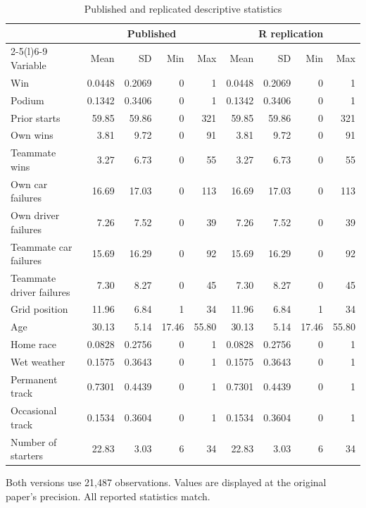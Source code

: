 \begin{table}[!htbp]
\centering
\caption{Published and replicated descriptive statistics}
\label{tab:descriptive}
\fontsize{8.5}{10}\selectfont
\setlength{\tabcolsep}{2pt}
\renewcommand{\arraystretch}{1.08}
\begin{tabular*}{\linewidth}{@{\extracolsep{\fill}}lrrrrrrrr@{}}
\toprule
 & \multicolumn{4}{c}{Published} & \multicolumn{4}{c}{R replication} \\
\cmidrule(lr){2-5}\cmidrule(l){6-9}
Variable & Mean & SD & Min & Max & Mean & SD & Min & Max \\
\midrule
Win & 0.0448 & 0.2069 & 0 & 1 & 0.0448 & 0.2069 & 0 & 1 \\
Podium & 0.1342 & 0.3406 & 0 & 1 & 0.1342 & 0.3406 & 0 & 1 \\
Prior starts & 59.85 & 59.86 & 0 & 321 & 59.85 & 59.86 & 0 & 321 \\
Own wins & 3.81 & 9.72 & 0 & 91 & 3.81 & 9.72 & 0 & 91 \\
Teammate wins & 3.27 & 6.73 & 0 & 55 & 3.27 & 6.73 & 0 & 55 \\
Own car failures & 16.69 & 17.03 & 0 & 113 & 16.69 & 17.03 & 0 & 113 \\
Own driver failures & 7.26 & 7.52 & 0 & 39 & 7.26 & 7.52 & 0 & 39 \\
Teammate car failures & 15.69 & 16.29 & 0 & 92 & 15.69 & 16.29 & 0 & 92 \\
Teammate driver failures & 7.30 & 8.27 & 0 & 45 & 7.30 & 8.27 & 0 & 45 \\
Grid position & 11.96 & 6.84 & 1 & 34 & 11.96 & 6.84 & 1 & 34 \\
Age & 30.13 & 5.14 & 17.46 & 55.80 & 30.13 & 5.14 & 17.46 & 55.80 \\
Home race & 0.0828 & 0.2756 & 0 & 1 & 0.0828 & 0.2756 & 0 & 1 \\
Wet weather & 0.1575 & 0.3643 & 0 & 1 & 0.1575 & 0.3643 & 0 & 1 \\
Permanent track & 0.7301 & 0.4439 & 0 & 1 & 0.7301 & 0.4439 & 0 & 1 \\
Occasional track & 0.1534 & 0.3604 & 0 & 1 & 0.1534 & 0.3604 & 0 & 1 \\
Number of starters & 22.83 & 3.03 & 6 & 34 & 22.83 & 3.03 & 6 & 34 \\
\bottomrule
\end{tabular*}
\par\vspace{4pt}\begin{minipage}{\linewidth}\footnotesize
Both versions use 21,487 observations. Values are displayed at the original paper's precision. All reported statistics match.
\end{minipage}
\end{table}
